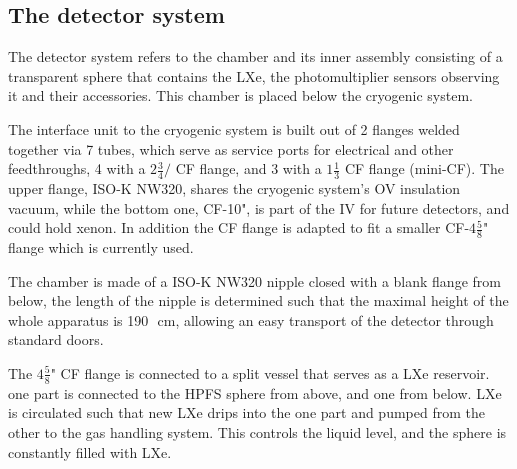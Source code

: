 \subsection{The detector system}
\label{subsec:det}
 
The detector system refers to the chamber and its inner assembly consisting of a transparent sphere that 
contains the LXe, the photomultiplier sensors observing it and their accessories. This chamber is placed below the cryogenic system. 



The interface unit to the cryogenic system is built out of 2 flanges welded together via 7 tubes, which serve as service ports for electrical and other feedthroughs, 4 
with a $2 \frac{3}{4}/$ CF flange, and 3 with a $1\frac{1}{3}$ CF flange (mini-CF). 
The upper flange, ISO-K NW320, shares the cryogenic system's OV insulation vacuum, while the bottom one, CF-10", is part of the IV for future detectors, and could hold xenon. 
In addition the CF flange is adapted to fit a smaller CF-$4\frac{5}{8}$" flange which is currently used.

The chamber is made of a ISO-K NW320 nipple closed with a blank flange from below, 
the length of the nipple is determined such that the maximal height of the whole 
apparatus is 190~\,cm, allowing an easy transport of the detector through standard doors.
 
The $4\frac{5}{8}$" CF flange is connected to a split vessel that serves as a LXe reservoir. one part is connected 
to the HPFS sphere from above, and one from below. LXe is circulated such that new LXe drips into the one part and pumped from the other to the gas handling system. This controls the liquid level, and the sphere is constantly filled with LXe. 

